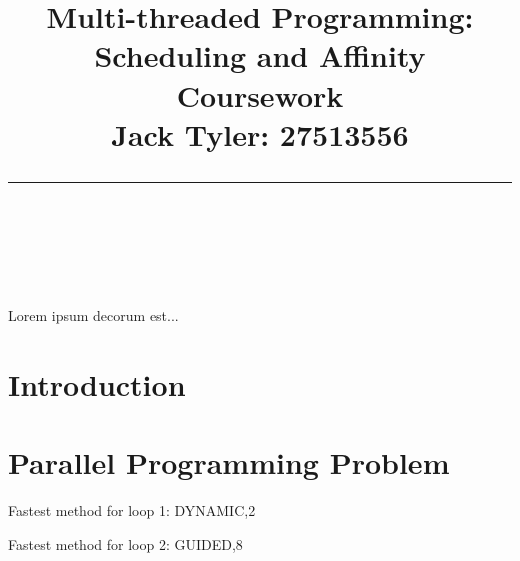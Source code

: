 \documentclass{article} %
\title{\raggedright
\normalfont \normalsize 
\huge Multi-threaded Programming: Scheduling and Affinity Coursework \\[2em]
\normalsize \normalfont Jack Tyler: 27513556 \\
\rule{\linewidth}{.5pt}  \\[6pt]
}
\begin{document}
\maketitle

Lorem ipsum decorum est...

\section{Introduction}

\section{Parallel Programming Problem}


Fastest method for loop 1: DYNAMIC,2

Fastest method for loop 2: GUIDED,8
\end{document}
